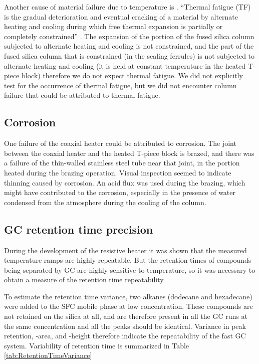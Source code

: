 Another cause of material failure due to temperature is . ``Thermal fatigue (TF) is the gradual deterioration and eventual
cracking of a material by alternate heating and cooling during which free
thermal expansion is partially or completely constrained'' \autocite{Rao2001}.
The expansion of the portion of the fused silica column subjected to alternate
heating and cooling is not constrained, and the part of the fused silica column
that is constrained (in the sealing ferrules) is not subjected to alternate
heating and cooling (it is held at constant temperature in the heated T-piece
block) therefore we do not expect thermal fatigue. We did not explicitly test
for the occurrence of thermal fatigue, but we did not encounter column failure
that could be attributed to thermal fatigue.

\subsection{Corrosion}
One failure of the coaxial heater could be attributed to corrosion. The joint
between the coaxial heater and the heated T-piece block is brazed, and there was
a failure of the thin-walled stainless steel tube near that joint, in the
portion heated during the brazing operation. Visual inspection seemed to
indicate thinning caused by corrosion. An acid flux was used during the brazing,
which might have contributed to the corrosion, especially in the presence of
water condensed from the atmosphere during the cooling of the column.

\subsection{GC retention time precision}

During the development of the resistive heater it was shown that the measured
temperature ramps are highly repeatable. But the retention times of  compounds
being separated by GC are highly sensitive to temperature, so it was necessary
to obtain a measure of the retention time repeatability.

To estimate the retention time variance, two alkanes (dodecane and hexadecane)
were added to the SFC mobile phase at low concentration. These compounds are not
retained on the silica at all, and are therefore present in all the GC runs at
the same concentration and all the peaks should be identical. Variance in peak
retention, -area, and -height therefore indicate the repeatability of the fast
GC system. Variability of retention time is summarized in Table
\ref{tab:RetentionTimeVariance}

